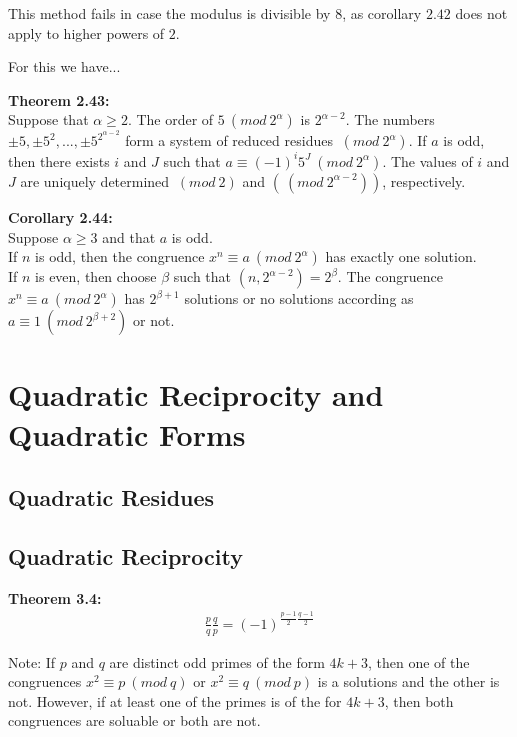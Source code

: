 \documentclass[a4paper]{article}
\begin{document}
This method fails in case the modulus is divisible by $8$, as corollary $2.42$ does not apply to higher powers of $2$.

For this we have...

\textbf{Theorem 2.43:}\\
Suppose that $\alpha\geq 2$. The order of $5 \ (mod\ 2^\alpha)$ is $2^{\alpha-2}$. The numbers $\pm 5,\pm 5^2,...,\pm 5^2^{\alpha-2}$ form a system of reduced residues $\ (mod\ 2^{\alpha})$. If $a$ is odd, then there exists $i$ and $J$ such that $a \equiv  (-1)^i5^J \ (mod\ 2^{\alpha})$. The values of $i$ and $J$ are uniquely determined $\ (mod\ 2)$ and $(\ (mod\ 2^{\alpha-2}))$, respectively.

\textbf{Corollary 2.44:}\\
Suppose $\alpha \geq 3$ and that $a$ is odd.\\
If $n$ is odd, then the congruence $x^n \equiv  a \ (mod\ 2^{\alpha})$ has exactly one solution.\\
If $n$ is even, then choose $\beta$ such that $(n,2^{\alpha-2})=2^\beta$. The congruence $x^n \equiv a \ (mod\ 2^{\alpha})$ has $2^{\beta+1}$ solutions or no solutions according as $a \equiv  1 \ (mod\ 2^{\beta+2})$ or not.


\section{Quadratic Reciprocity and Quadratic Forms}


\subsection{Quadratic Residues}

\subsection{Quadratic Reciprocity}


\textbf{Theorem 3.4:}\\

\begin{align}
    \frac{p}{q}\frac{q}{p}=(-1)^{\frac{p-1}{2}\frac{q-1}{2}}
\end{align}

Note: If $p$ and $q$ are distinct odd primes of the form $4k+3$, then one of the congruences $x^2\equiv p\ (mod\ q)$ or $x^2\equiv q\ (mod\ p)$ is a solutions and the other is not. However, if at least one of the primes is of the for $4k+3$, then both congruences are soluable or both are not.
\end{document}
